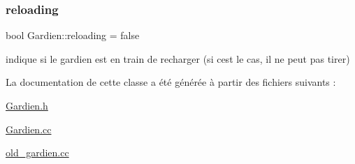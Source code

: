 \subsubsection{\texorpdfstring{reloading}{reloading}}
{\footnotesize\ttfamily bool Gardien\+::reloading = false\hspace{0.3cm}{\ttfamily [private]}}



indique si le gardien est en train de recharger (si c\textquotesingle{}est le cas, il ne peut pas tirer) 



La documentation de cette classe a été générée à partir des fichiers suivants \+:\begin{DoxyCompactItemize}
\item 
\hyperlink{Gardien_8h}{Gardien.\+h}\item 
\hyperlink{Gardien_8cc}{Gardien.\+cc}\item 
\hyperlink{old__gardien_8cc}{old\+\_\+gardien.\+cc}\end{DoxyCompactItemize}
